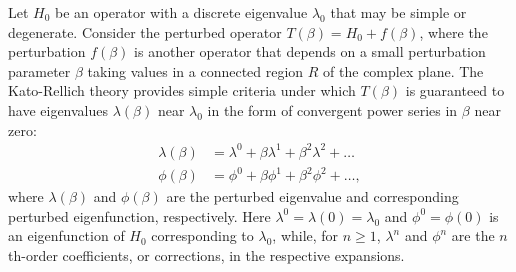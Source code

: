 \documentclass[preprint,12pt]{elsarticle}
\begin{document}

Let $H_0$ be an operator with a discrete eigenvalue $\lambda_0$ that may be simple or degenerate. Consider the perturbed operator $T(\beta)=H_0+f(\beta)$, where the perturbation $f(\beta)$ is another operator that depends on a small perturbation parameter $\beta$ taking values in a connected region $R$ of the complex plane. The Kato-Rellich theory provides simple criteria under which $T(\beta)$ is guaranteed to have eigenvalues $\lambda(\beta)$ near $\lambda_0$ in the form of convergent power series in $\beta$ near zero:
\begin{align}\label{series_solution_reg_pert_th}
    \lambda(\beta)&=\lambda^0+\beta \lambda^1+\beta^2\lambda^2+\ldots\\
    \phi(\beta)&=\phi^0+\beta\phi^1+\beta^2\phi^2+\ldots,
\end{align}
where $\lambda(\beta)$ and $\phi(\beta)$ are the perturbed eigenvalue and corresponding perturbed eigenfunction, respectively. Here $\lambda^0=\lambda(0)=\lambda_0$ and
$\phi^0=\phi(0)$ is an eigenfunction of $H_0$ corresponding to
$\lambda_0$, while, for $n\geq1$, $\lambda^n$ and $\phi^n$ are the
$n$th-order coefficients, or corrections, in the respective expansions.
\end{document}
